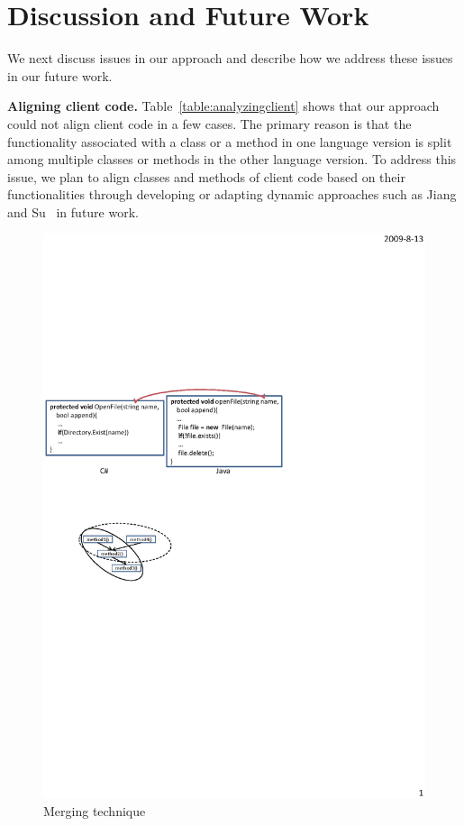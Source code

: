 \section{Discussion and Future Work}
\label{sec:discuss}

We next discuss issues in our approach and describe how we address
these issues in our future work.

\textbf{Aligning client code.} Table~\ref{table:analyzingclient}
shows that our approach could not align client code in a few cases.
The primary reason is that the functionality associated with a class
or a method in one language version is split among multiple classes
or methods in the other language version. To address this issue, we
plan to align classes and methods of client code based on their
functionalities through developing or adapting dynamic approaches
such as Jiang and Su~\cite{jiang2009automatic} in future work.

\begin{figure}[t]
\centering
\includegraphics[scale=1,clip]{figure/n2n.eps}\vspace*{-3ex}
 \caption{Merging technique}\vspace*{-3.5ex}
 \label{fig:n2n}
\end{figure}

